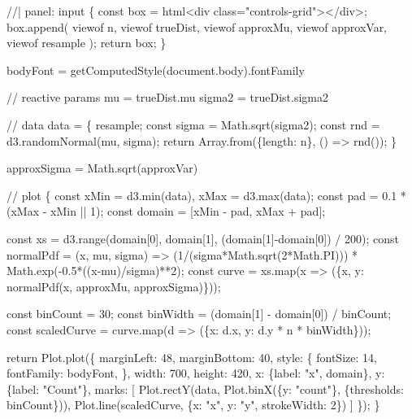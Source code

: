 \documentclass[
  letterpaper,
  DIV=11,
  numbers=noendperiod]{scrreprt}
\newenvironment{Shaded}{\begin{snugshade}}{\end{snugshade}}
\newcommand{\NormalTok}[1]{\textcolor[rgb]{0.00,0.23,0.31}{#1}}
\theoremstyle{definition}
\theoremstyle{plain}
\theoremstyle{definition}
\theoremstyle{remark}
\begin{document}
\begin{Shaded}
\begin{Highlighting}[]
\NormalTok{//| panel: input}
\NormalTok{\{}
\NormalTok{  const box = html\textasciigrave{}\textless{}div class="controls{-}grid"\textgreater{}\textless{}/div\textgreater{}\textasciigrave{};}
\NormalTok{  box.append(}
\NormalTok{    viewof n,}
\NormalTok{    viewof trueDist,}
\NormalTok{    viewof approxMu,}
\NormalTok{    viewof approxVar,}
\NormalTok{    viewof resample}
\NormalTok{  );}
\NormalTok{  return box;}
\NormalTok{\}}
\end{Highlighting}
\end{Shaded}

\begin{Shaded}
\begin{Highlighting}[]
\NormalTok{bodyFont = getComputedStyle(document.body).fontFamily}
\end{Highlighting}
\end{Shaded}

\begin{Shaded}
\begin{Highlighting}[]
\NormalTok{// reactive params}
\NormalTok{mu = trueDist.mu}
\NormalTok{sigma2 = trueDist.sigma2}



\NormalTok{// data}
\NormalTok{data = \{}
\NormalTok{  resample;}
\NormalTok{  const sigma = Math.sqrt(sigma2);}
\NormalTok{  const rnd = d3.randomNormal(mu, sigma);}
\NormalTok{  return Array.from(\{length: n\}, () =\textgreater{} rnd());}
\NormalTok{\}}

\NormalTok{approxSigma = Math.sqrt(approxVar)}

\NormalTok{// plot}
\NormalTok{\{}
\NormalTok{  const xMin = d3.min(data), xMax = d3.max(data);}
\NormalTok{  const pad = 0.1 * (xMax {-} xMin || 1);}
\NormalTok{  const domain = [xMin {-} pad, xMax + pad];}

\NormalTok{  const xs = d3.range(domain[0], domain[1], (domain[1]{-}domain[0]) / 200);}
\NormalTok{  const normalPdf = (x, mu, sigma) =\textgreater{} (1/(sigma*Math.sqrt(2*Math.PI))) * Math.exp({-}0.5*((x{-}mu)/sigma)**2);}
\NormalTok{  const curve = xs.map(x =\textgreater{} (\{x, y: normalPdf(x, approxMu, approxSigma)\}));}

\NormalTok{  const binCount = 30;}
\NormalTok{  const binWidth = (domain[1] {-} domain[0]) / binCount;}
\NormalTok{  const scaledCurve = curve.map(d =\textgreater{} (\{x: d.x, y: d.y * n * binWidth\}));}

\NormalTok{  return Plot.plot(\{}
\NormalTok{    marginLeft: 48,}
\NormalTok{    marginBottom: 40,}
\NormalTok{    style: \{}
\NormalTok{      fontSize: 14,}
\NormalTok{      fontFamily: bodyFont,}
\NormalTok{    \},}
\NormalTok{    width: 700,}
\NormalTok{    height: 420,}
\NormalTok{    x: \{label: "x", domain\},}
\NormalTok{    y: \{label: "Count"\},}
\NormalTok{    marks: [}
\NormalTok{      Plot.rectY(data, Plot.binX(\{y: "count"\}, \{thresholds: binCount\})),}
\NormalTok{      Plot.line(scaledCurve, \{x: "x", y: "y", strokeWidth: 2\})}
\NormalTok{    ]}
\NormalTok{  \});}
\NormalTok{\}}
\end{Highlighting}
\end{Shaded}
\end{document}
